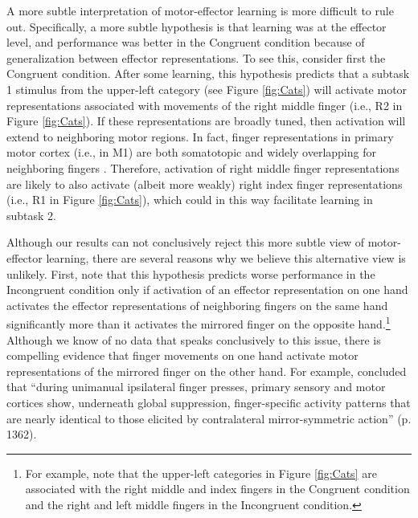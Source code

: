 \documentclass[doc, floatsintext]{apa7}
\begin{document}
A more subtle interpretation of motor-effector learning is more difficult to rule out. Specifically, a more subtle hypothesis is that learning was at the effector level,  and performance was better in the Congruent condition because of generalization between effector representations. To see this, consider first the Congruent condition. After some learning, this hypothesis predicts that a subtask 1 stimulus from the upper-left category (see Figure \ref{fig:Cats}) will activate motor representations associated with movements of the right middle finger (i.e., R2 in Figure \ref{fig:Cats}). If these representations are broadly tuned, then activation will extend to neighboring motor regions. In fact, finger representations in primary motor cortex (i.e., in M1) are both somatotopic and widely overlapping for neighboring fingers \parencite{DechentFrahm2003, EjazEtAl2015}.  Therefore, activation of right middle finger representations are likely to also activate (albeit more weakly) right index finger representations (i.e., R1 in Figure \ref{fig:Cats}), which could in this way facilitate learning in subtask 2. 

Although our results can not conclusively reject this more subtle view of motor-effector learning, there are several reasons why we believe this alternative view is unlikely. First, note that this hypothesis predicts worse performance in the Incongruent condition only if activation of an effector representation on one hand activates the effector representations of neighboring fingers on the same hand significantly more than it activates the mirrored finger on the opposite hand.\footnote{For example, note that the upper-left categories in Figure \ref{fig:Cats} are associated with the right middle and index fingers in the Congruent condition and the right and left middle fingers in the Incongruent condition.} Although we know of no data that speaks conclusively to this issue, there is compelling evidence that finger movements on one hand activate motor representations of the mirrored finger on the other hand. For example,  \textcite{DiedrichsenEtAl2013} concluded that ``during unimanual ipsilateral finger presses, primary sensory and motor cortices show, underneath global suppression, finger-specific activity patterns that are nearly identical to those elicited by contralateral mirror-symmetric action'' (p. 1362).
\end{document}
